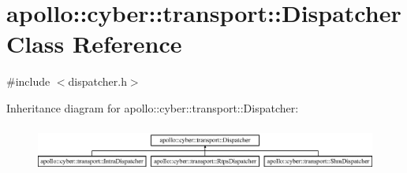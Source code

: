 \hypertarget{classapollo_1_1cyber_1_1transport_1_1Dispatcher}{\section{apollo\-:\-:cyber\-:\-:transport\-:\-:Dispatcher Class Reference}
\label{classapollo_1_1cyber_1_1transport_1_1Dispatcher}
}


{\ttfamily \#include $<$dispatcher.\-h$>$}

Inheritance diagram for apollo\-:\-:cyber\-:\-:transport\-:\-:Dispatcher\-:\begin{figure}[H]
\begin{center}
\leavevmode
\includegraphics[height=1.549101cm]{classapollo_1_1cyber_1_1transport_1_1Dispatcher}
\end{center}
\end{figure}
